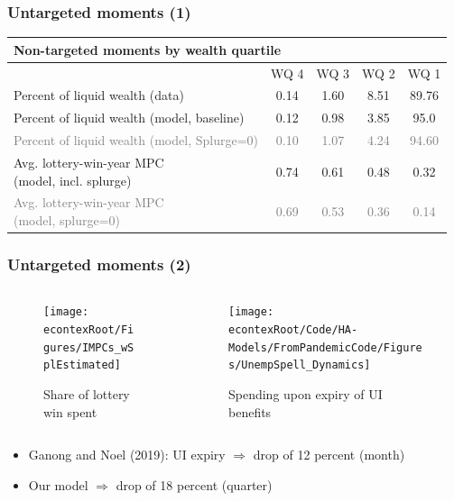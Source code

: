 \documentclass[pdflatex,aspectratio=169]{beamer}
\begin{document}
{\begin{frame}
            \end{frame}
            
          }{}


\begin{frame}
\frametitle{Untargeted moments (1)}
\begin{tabular}{lcccc}
	\multicolumn{5}{l}{Non-targeted moments by wealth quartile} \\ \midrule
	& WQ 4 & WQ 3 & WQ 2 & WQ 1 \\ \midrule
	Percent of liquid wealth (data) & 0.14 & 1.60 & 8.51 & 89.76 \\
	Percent of liquid wealth (model, baseline) & 0.12 & 0.98 & 3.85 & 95.0 \\
	\textcolor{gray}{Percent of liquid wealth (model, Splurge=0)} & \textcolor{gray}{0.10} & \textcolor{gray}{1.07} & \textcolor{gray}{4.24} & \textcolor{gray}{94.60} \\
	\makecell[l]{Avg. lottery-win-year MPC \\ (model, incl. splurge)} & 0.74 & 0.61 & 0.48 & 0.32 \\
	\makecell[l]{\textcolor{gray}{Avg. lottery-win-year MPC} \\ \textcolor{gray}{(model, splurge=0)}} & \textcolor{gray}{0.69} & \textcolor{gray}{0.53} & \textcolor{gray}{0.36} & \textcolor{gray}{0.14}
	\\ \bottomrule 
\end{tabular}
\end{frame}

\begin{frame}
\frametitle{Untargeted moments (2)}
\begin{columns}
	\begin{column}{0.50\textwidth}
		\begin{figure}
			\texttt{[image: \\econtexRoot/Figures/IMPCs\_wSplEstimated]}
			\caption{Share of lottery win spent}
		\end{figure}
	\end{column}
	\begin{column}{0.50\textwidth}
		\begin{figure}
			\texttt{[image: \\econtexRoot/Code/HA-Models/FromPandemicCode/Figures/UnempSpell\_Dynamics]}
			\caption{Spending upon expiry of UI benefits}
		\end{figure}
	\end{column}
\end{columns}
\begin{itemize}
	\item Ganong and Noel (2019): UI expiry $\Rightarrow$ drop of 12 percent (month)
	\item Our model $\Rightarrow$ drop of 18 percent (quarter) 
\end{itemize}
\end{frame}
\end{document}
